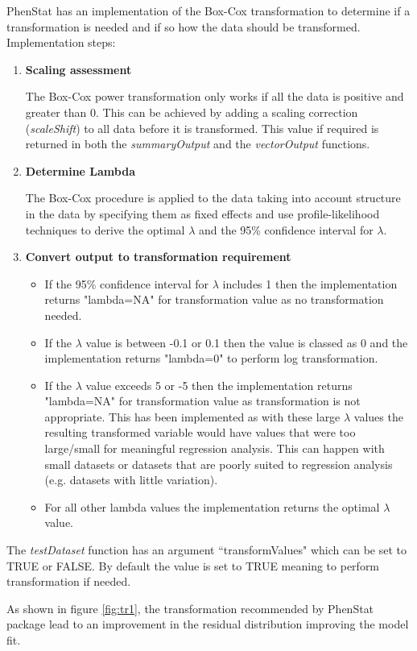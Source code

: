 \documentclass[12pt,a4paper]{article}
\begin{document}
PhenStat has an implementation of the Box-Cox transformation to determine if a transformation is needed and if so how the data should be transformed. 
Implementation steps:
\begin{enumerate}
\item  \textbf{Scaling assessment}

The Box-Cox power transformation only works if all the data is positive and greater than 0. This can be achieved by adding a scaling correction (\textit{scaleShift}) to all data before it is transformed. This value if required is returned in both the \textit{summaryOutput} and the \textit{vectorOutput} functions. 
\item \textbf{Determine Lambda}

The Box-Cox procedure is applied to the data taking into account structure in the data by specifying them as fixed effects and use profile-likelihood techniques to derive the optimal $\lambda$ and the 95\% confidence interval for $\lambda$.
\item  \textbf{Convert output to transformation requirement}
\begin{itemize}
\item If the 95\% confidence interval for $\lambda$ includes 1 then the implementation returns "lambda=NA" for transformation value as no transformation needed.
\item If the $\lambda$ value is between -0.1 or 0.1 then the value is classed as 0 and the implementation returns "lambda=0" to perform log transformation. 
\item If the $\lambda$ value exceeds 5 or -5 then the implementation returns "lambda=NA" for transformation value as transformation is not appropriate. This has been implemented as with these large $\lambda$ values the resulting transformed variable would have values that were too large/small for meaningful regression analysis. This can happen with small datasets or datasets that are poorly suited to regression analysis (e.g. datasets with little variation). 
\item For all other lambda values the implementation returns the optimal $\lambda$ value.  
\end{itemize}
\end{enumerate}

The \textit{testDataset} function has an argument “transformValues" which can be set to TRUE or FALSE. By default the value is set to TRUE meaning to perform transformation if needed.

As shown in figure \ref{fig:tr1}, the transformation recommended by PhenStat package lead to an improvement in the residual distribution improving the model fit.  
\end{document}
